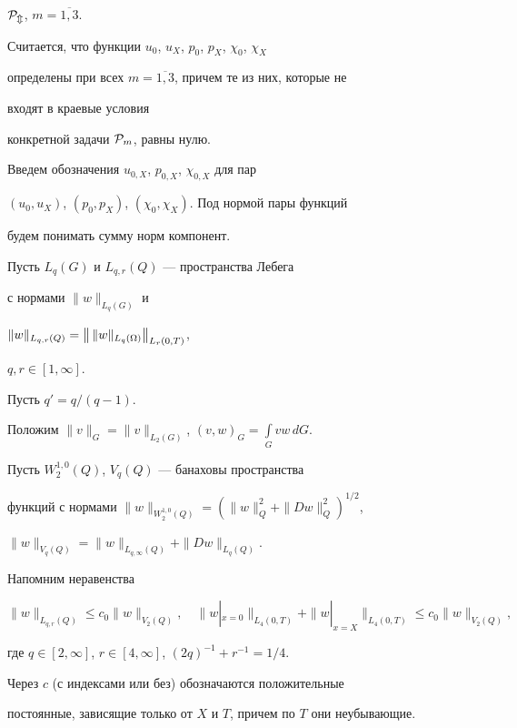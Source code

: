 $\cal P_m$, $m=\overline{1,3}$.


\addtocounter{equation}{1}





Считается, что функции $u_0$, $u_X$, $p_0$, $p_X$, $\chi_0$, $\chi_X$


определены при всех $m=\overline{1,3}$, причем те из них, которые не


входят в краевые условия


конкретной задачи ${\cal P}_m$, равны нулю.


Введем обозначения $u_{0,X}$, $p_{0,X}$, $\chi_{0,X}$ для пар


$(u_0,u_X)$, $(p_0,p_X)$, $(\chi_0,\chi_X)$. Под нормой пары функций


будем понимать сумму норм компонент.





Пусть $L_q(G)$ и $L_{q,r}(Q)$ --- пространства Лебега


с нормами $\|w\|_{L_q(G)}$ и


$\|w\|_{L_{q,r}(Q)}=\linebreak \big\|\,\|w\|_{L_q(\Omega)}\big\|_{L_r(0,T)}$,


$q,r\in [1,\infty]$.


Пусть $q'=q/(q-1)$.


Положим $\|v\|_G=\|v\|_{L_2(G)}$, $(v,w)_G=\int\limits_G vw\,dG.$


Пусть $W_2^{1,0}(Q)$, $V_q(Q)$ --- банаховы пространства


функций с нормами $\|w\|_{W_2^{1,0}(Q)}=(\|w\|^2_Q+\|Dw\|^2_Q)^{1/2}$,


$\|w\|_{V_q(Q)}=\|w\|_{L_{q,\infty}(Q)}+\|Dw\|_{L_q(Q)}$.


Напомним неравенства


$$


\|w\|_{L_{q,r}(Q)}\le c_0\|w\|_{V_2(Q)},\quad


\|w|_{x=0}\|_{L_4(0,T)}+\|w|_{x=X}\|_{L_4(0,T)}\le c_0\|w\|_{V_2(Q)},


$$


где $q\in [2,\infty]$, $r\in [4,\infty]$, $(2q)^{-1}+r^{-1}=1/4$.


Через $c$ (с индексами или без) обозначаются положительные


постоянные, зависящие только от $X$ и $T$, причем по $T$ они неубывающие.





